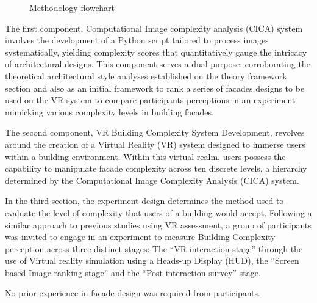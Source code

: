 \begin{figure}[!htb]
      \caption{Methodology flowchart}
      \label{fig:MethodologyFlowchart}
    \end{figure}

The first component, Computational Image complexity analysis (CICA) system involves the development of a Python script tailored to process images systematically, yielding complexity scores that quantitatively gauge the intricacy of architectural designs.
This component serves a dual purpose: corroborating the theoretical architectural style analyses established on the theory framework section and also as an initial framework to rank a series of facades designs to be used on the VR system to compare participants perceptions in an experiment mimicking various complexity levels in building facades.

The second component, VR Building Complexity System Development, revolves around the creation of a Virtual Reality (VR) system designed to immerse users within a building environment.
Within this virtual realm, users possess the capability to manipulate facade complexity across ten discrete levels, a hierarchy determined by the Computational Image Complexity Analysis (CICA) system.

In the third section, the experiment design determines the method used to evaluate the level of complexity that users of a building would accept.
Following a similar approach to previous studies using VR assessment\cite{Wolfartsberger2019}, a group of participants was invited to engage in an experiment to measure Building Complexity perception across three distinct stages: The ``VR interaction stage'' through the use of Virtual reality simulation using a Heads-up Display (HUD), the ``Screen based Image ranking stage'' and the ``Post-interaction survey'' stage.

No prior experience in facade design was required from participants.


